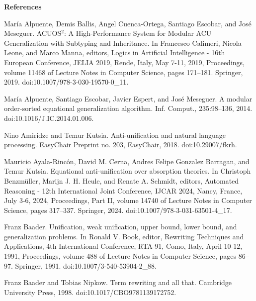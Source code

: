
 
\par\medskip\noindent\textbf{References}\par
  
\par\noindent  [1]  María Alpuente, Demis Ballis, Angel Cuenca-Ortega, Santiago Escobar, and José Meseguer.  ACUOS${}^{\mbox{2}}$: A High-Performance System for Modular ACU Generalization with Subtyping and Inheritance.  In Francesco Calimeri, Nicola Leone, and Marco Manna, editors, Logics in Artificial Intelligence - 16th European Conference, JELIA 2019, Rende, Italy, May 7-11, 2019, Proceedings, volume 11468 of Lecture Notes in Computer Science, pages 171–181. Springer, 2019.  doi:10.1007/978-3-030-19570-0\_11.  
 
\par\noindent  [2]  María Alpuente, Santiago Escobar, Javier Espert, and José Meseguer.  A modular order-sorted equational generalization algorithm.  Inf. Comput., 235:98–136, 2014.  doi:10.1016/J.IC.2014.01.006.  
 
\par\noindent  [3]  Nino Amiridze and Temur Kutsia.  Anti-unification and natural language processing.  EasyChair Preprint no. 203, EasyChair, 2018.  doi:10.29007/fkrh.  
 
\par\noindent  [4]  Mauricio Ayala-Rincón, David M. Cerna, Andres Felipe Gonzalez Barragan, and Temur Kutsia.  Equational anti-unification over absorption theories.  In Christoph Benzmüller, Marijn J. H. Heule, and Renate A. Schmidt, editors, Automated Reasoning - 12th International Joint Conference, IJCAR 2024, Nancy, France, July 3-6, 2024, Proceedings, Part II, volume 14740 of Lecture Notes in Computer Science, pages 317–337. Springer, 2024.  doi:10.1007/978-3-031-63501-4\_17.  
 
\par\noindent  [5]  Franz Baader.  Unification, weak unification, upper bound, lower bound, and generalization problems.  In Ronald V. Book, editor, Rewriting Techniques and Applications, 4th International Conference, RTA-91, Como, Italy, April 10-12, 1991, Proceedings, volume 488 of Lecture Notes in Computer Science, pages 86–97. Springer, 1991.  doi:10.1007/3-540-53904-2\_88.  
 
\par\noindent  [6]  Franz Baader and Tobias Nipkow.  Term rewriting and all that.  Cambridge University Press, 1998.  doi:10.1017/CBO9781139172752.  
 
